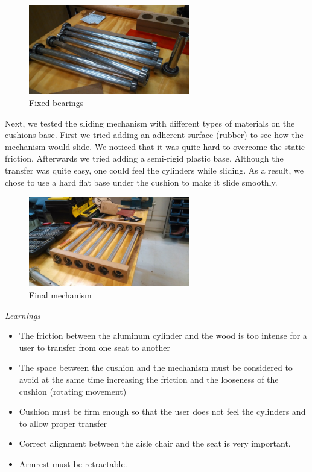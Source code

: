 \begin{figure}[h]
\centering
\includegraphics[width=7cm]{brazil_images/image041.jpg}
\caption{Fixed bearings}
\label{fig:fixed}
\end{figure}


Next, we tested the sliding mechanism with different types of materials on the cushions base. First we tried adding an adherent surface (rubber) to see how the mechanism would slide. We noticed that it was quite hard to overcome the static friction. Afterwards we tried adding a semi-rigid plastic base. Although the transfer was quite easy, one could feel the cylinders while sliding. As a result, we chose to use a hard flat base under the cushion to make it slide smoothly.   


\begin{figure}[h]
\centering
\includegraphics[width=7cm]{brazil_images/image042.jpg}
\caption{Final mechanism}
\label{fig:final_mechanism}
\end{figure}


\emph{Learnings}

\begin{itemize}
	\item The friction between the aluminum cylinder and the wood is too intense for a user to transfer from one seat to another
	\item The space between the cushion and the mechanism must be considered to avoid at the same time increasing the friction and the looseness of the cushion (rotating movement)
	\item Cushion must be firm enough so that the user does not feel the cylinders and to allow proper transfer
	\item Correct alignment between the aisle chair and the seat is very important.
	\item Armrest must be retractable.
\end{itemize}


